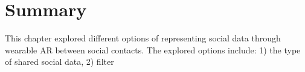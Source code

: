 \section{Summary}

This chapter explored different options of representing social data through wearable AR between social contacts. The explored options include: 1) the type of shared social data, 2) filter 

